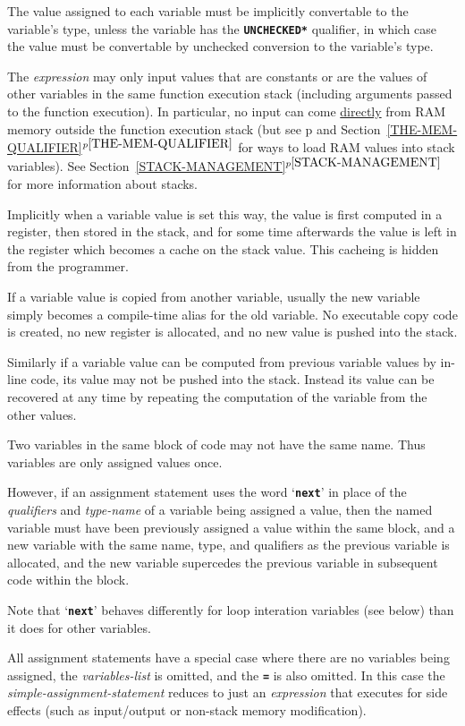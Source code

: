 \documentclass[12pt]{article}
\newcommand{\TT}[1]{{\tt \bfseries #1}}
\newcommand{\itemref}[1]{\ref{#1}$^{p\pageref{#1}}$}
\newcommand{\pagref}[1]{p\pageref{#1}}
\begin{document}
The value assigned to each variable
must be implicitly convertable to the variable's type, unless
the variable has the \TT{*UNCHECKED*} qualifier, in which case
the value must be convertable by unchecked conversion to the
variable's type.

The {\em expression} may only input values that are constants or are
the values of other variables in the same function execution
stack (including
arguments passed to the function execution).  In particular,
no input can come \underline{directly}
from RAM memory outside the function execution stack
(but see \pagref{MEM} and Section~\itemref{THE-MEM-QUALIFIER}
for ways to load RAM values into stack variables).
See Section~\itemref{STACK-MANAGEMENT} for more information about stacks.

Implicitly when a variable value is set this way, the value is first
computed in a register, then stored in the stack, and for some time
afterwards the value is left in the register which becomes a cache
on the stack value.  This cacheing is hidden from the programmer.

If a variable value is copied from another variable, usually the
new variable simply becomes a compile-time alias for the old variable.
No executable copy code is created, no new register is allocated, and no new
value is pushed into the stack.

Similarly if a variable value can be computed from previous variable
values by in-line code, 
its value may not be pushed into the stack.  Instead its
value can be recovered at any time by repeating the computation
of the variable from the other values.

Two variables in the same block of code may not have the same
name.  Thus variables are only assigned values once.

However, if an assignment statement uses the word `\TT{next}' in
place of the {\em qualifiers} and {\em type-name}
of a variable being assigned a value, then the named variable must
have been previously assigned a value within the same block,
and a new variable with the same
name, type, and qualifiers as the previous variable is allocated,
and the new variable supercedes the previous variable in subsequent code within
the block.

Note that `\TT{next}' behaves differently for loop interation
variables (see below) than it does for other variables.

All assignment statements have a special case where there are
no variables being assigned, the {\em variables-list} is omitted,
and the \TT{=} is also omitted.  In this case the
{\em simple-assignment-statement} reduces to just an {\em expression}
that executes for side effects (such as
input/output or non-stack memory modification).
\end{document}
